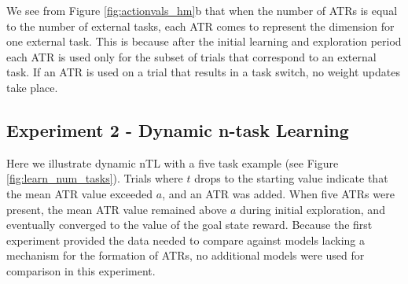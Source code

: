 \documentclass[10pt,letterpaper]{article}
\begin{document}

We see from Figure \ref{fig:actionvals_hm}b that when the number of ATRs is equal to the number of external tasks, each ATR comes to represent the dimension for one external task. This is because after the initial learning and exploration period each ATR is used only for the subset of trials that correspond to an external task. If an ATR is used on a trial that results in a task switch, no weight updates take place.

\subsection{Experiment 2 - Dynamic n-task Learning}

Here we illustrate dynamic nTL with a five task example (see Figure \ref{fig:learn_num_tasks}). Trials where $t$ drops to the starting value indicate that the mean ATR value exceeded $a$, and an ATR was added. When five ATRs were present, the mean ATR value remained above $a$ during initial exploration, and eventually converged to the value of the goal state reward. Because the first experiment provided the data needed to compare against models lacking a mechanism for the formation of ATRs, no additional models were used for comparison in this experiment.
\end{document}
